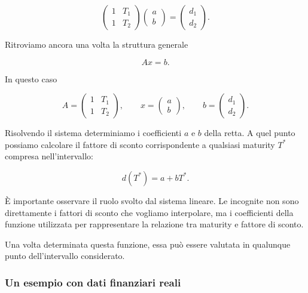 \begin{equation*}
\begin{pmatrix}
1 & T_1\\
1 & T_2
\end{pmatrix}
\begin{pmatrix}
a\\
b
\end{pmatrix}
=
\begin{pmatrix}
d_1\\
d_2
\end{pmatrix}.
\label{eq:linear-interpolation-system}
\end{equation*}

Ritroviamo ancora una volta la struttura generale

\begin{equation*}
    Ax=b.
\end{equation*}

In questo caso

\begin{equation*}
A=
\begin{pmatrix}
1&T_1\\
1&T_2
\end{pmatrix},
\qquad
x=
\begin{pmatrix}
a\\
b
\end{pmatrix},
\qquad
b=
\begin{pmatrix}
d_1\\
d_2
\end{pmatrix}.
\end{equation*}

Risolvendo il sistema determiniamo i coefficienti $a$ e $b$ della
retta. A quel punto possiamo calcolare il fattore di sconto
corrispondente a qualsiasi maturity $T^*$ compresa nell'intervallo:

\begin{equation*}
    d(T^*)=a+bT^*.
\end{equation*}

È importante osservare il ruolo svolto dal sistema lineare.
Le incognite non sono direttamente i fattori di sconto che vogliamo
interpolare, ma i coefficienti della funzione utilizzata per
rappresentare la relazione tra maturity e fattore di sconto.

Una volta determinata questa funzione, essa può essere valutata in
qualunque punto dell'intervallo considerato.


\subsubsection{Un esempio con dati finanziari reali}

